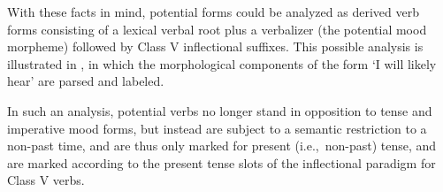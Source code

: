 \FB

With these facts in mind, potential forms could be analyzed as derived verb forms consisting of a lexical verbal root plus a verbalizer (the potential mood morpheme) followed by Class V inflectional suffixes. This possible analysis is illustrated in , %
in which the morphological components of the form \mbox{} ‘I will likely hear’ are parsed and labeled.
\ea\label{POTparsedEx}\z




In such an analysis, potential verbs no longer stand in opposition to tense and imperative mood forms, but instead are subject to a semantic restriction to a non-past time, and are thus only marked for present (i.e.,~non-past) tense, and are marked according to the present tense slots of the inflectional paradigm for Class V verbs. 

